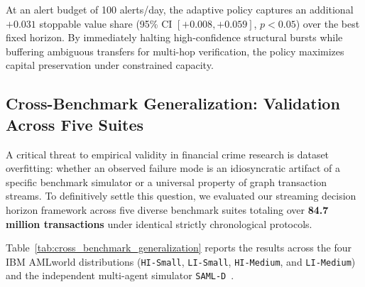 \documentclass[pdflatex,sn-mathphys,Numbered]{sn-jnl}
\theoremstyle{thmstyleone}
\theoremstyle{thmstyletwo}
\theoremstyle{thmstylethree}
\begin{document}
At an alert budget of 100 alerts/day, the adaptive policy captures an additional $+0.031$ stoppable value share (95\% CI $[+0.008, +0.059]$, $p < 0.05$) over the best fixed horizon. By immediately halting high-confidence structural bursts while buffering ambiguous transfers for multi-hop verification, the policy maximizes capital preservation under constrained capacity.

\subsection{Cross-Benchmark Generalization: Validation Across Five Suites}
\label{sec:cross_benchmark_generalization}

A critical threat to empirical validity in financial crime research is dataset overfitting: whether an observed failure mode is an idiosyncratic artifact of a specific benchmark simulator or a universal property of graph transaction streams. To definitively settle this question, we evaluated our streaming decision horizon framework across five diverse benchmark suites totaling over \textbf{84.7 million transactions} under identical strictly chronological protocols.

Table~\ref{tab:cross_benchmark_generalization} reports the results across the four IBM AMLworld distributions (\texttt{HI-Small}, \texttt{LI-Small}, \texttt{HI-Medium}, and \texttt{LI-Medium}) and the independent multi-agent simulator \texttt{SAML-D}~\cite{oztas2023samld}.
\end{document}
